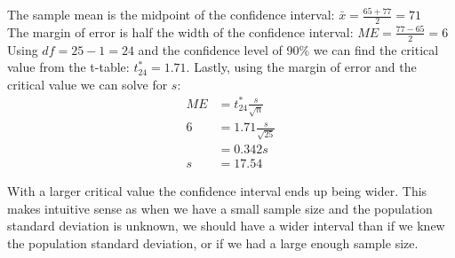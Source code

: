 {
{
The sample mean is the midpoint of the confidence interval: $\bar{x} = \frac{65 + 77}{2} = 71$ \\
The margin of error is half the width of the confidence interval: $ME = \frac{77 - 65}{2} = 6$ \\
Using $df = 25 - 1 = 24$ and the confidence level of 90\% we can find the critical value from the t-table: $t^*_{24} = 1.71$. Lastly, using the margin of error and the critical value we can solve for $s$:
\begin{align*}
ME &= t^*_{24} \frac{s}{\sqrt{n}} \\
6 &= 1.71 \frac{s}{\sqrt{25}} \\
&= 0.342 s \\
s &= 17.54
\end{align*}
}
}

%

{
With a larger critical value the confidence interval ends up being wider. This makes intuitive sense as when we have a small sample size and the population standard deviation is unknown, we should have a wider interval than if we knew the population standard deviation, or if we had a large enough sample size.
}


